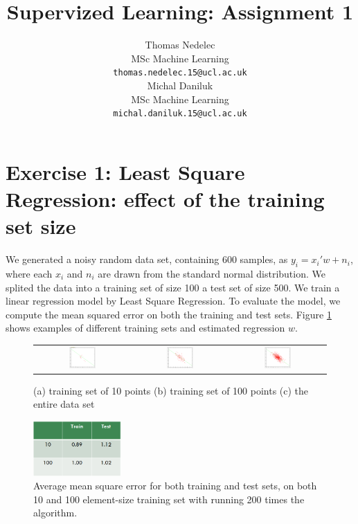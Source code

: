 \documentclass{article} %
\author{
Thomas Nedelec \\
MSc Machine Learning\\
\texttt{thomas.nedelec.15@ucl.ac.uk} \\
\And
Michal Daniluk \\
MSc Machine Learning\\
\texttt{michal.daniluk.15@ucl.ac.uk} \\
}
\title{Supervized Learning: Assignment 1}
\begin{document}
\maketitle

\section{Exercise 1: Least Square Regression: effect of the training set size}
We generated a noisy random data set, containing 600 samples, as $y_i = x_i'w + n_i$, where each $x_i$ and $n_i$ are drawn from the standard normal distribution. We splited the data into a training set of size 100 a test set of size 500. We train a linear regression model by Least Square Regression. To evaluate the model, we compute the mean squared error on both the training and test sets. Figure \ref{fig:lsr} shows examples of different training sets and estimated regression $w$.

 \begin{figure}[h]
\center
\begin{tabular}{ccc}
\includegraphics[width=0.3\textwidth]{10points}&\includegraphics[width=0.3\textwidth]{100points}&\includegraphics[width=0.3\textwidth]{500points}
\end{tabular}
\caption{ (a) training set of 10 points (b) training set of 100 points (c) the entire data set}
\label {fig:lsr}
\end{figure} 

\begin{figure}[h]
\begin{center}
\includegraphics[width=0.3\textwidth]{resultsMatrix}
\caption{Average mean square error for both training and test sets, on both 10 and 100 element-size training set with running 200 times the algorithm.}
\label{fig:resultMatrix1}
\end{center}
\end{figure}
\end{document}
